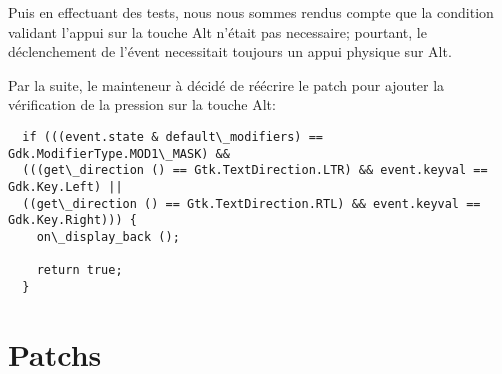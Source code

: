 \documentclass[12pt]{report}
\begin{document}
Puis en effectuant des tests, nous nous sommes rendus compte que la
condition validant l'appui sur la touche Alt n'était pas necessaire;
pourtant, le déclenchement de l'évent necessitait toujours un appui
physique sur Alt.

Par la suite, le mainteneur à décidé de réécrire le patch pour ajouter
la vérification de la pression sur la touche Alt:

\begin{verbatim}
  if (((event.state & default\_modifiers) == Gdk.ModifierType.MOD1\_MASK) &&
  (((get\_direction () == Gtk.TextDirection.LTR) && event.keyval == Gdk.Key.Left) ||
  ((get\_direction () == Gtk.TextDirection.RTL) && event.keyval == Gdk.Key.Right))) {
    on\_display_back ();

    return true;
  }
\end{verbatim}




\appendix






\chapter{Patchs} 
\end{document}
